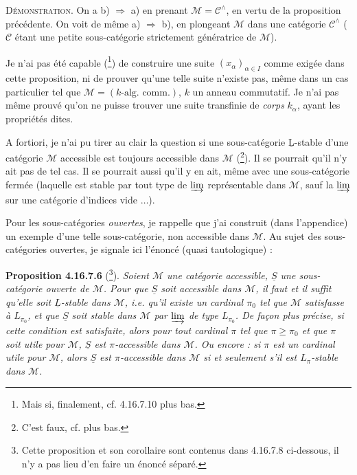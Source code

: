 \documentclass[11pt]{article}
\newcommand{\printedpage}[1]{\marginpar{\footnotesize p.~#1}}
\newcommand{\msp}[1]{\marginpar{\footnotesize [#1]}}
\newcommand{\cM}{\mathcal{M}}
\newcommand{\cC}{\mathcal{C}}
\newcommand{\uS}{\underline{S}}
\begin{document}
\textsc{Démonstration}. On a b) $\Longrightarrow$ a) en prenant $\cM = \cC^\wedge$, en vertu de la proposition précédente. On voit de même a) $\Longrightarrow$ b), en plongeant $\cM$ dans une catégorie $\cC^\wedge$ ($\cC$ étant une petite sous-catégorie strictement génératrice de $\cM$).

Je n'ai pas été capable (\footnote{Mais si, finalement, cf. 4.16.7.10 plus bas.}) de construire une suite $(x_\alpha)_{\alpha\in I}$ comme exigée dans cette proposition, ni de prouver qu'une telle suite n'existe pas, même dans un cas particulier tel que $\cM = (k\text{-alg. comm.})$, $k$ un anneau commutatif. Je n'ai pas
\msp{page 485}
même prouvé qu'on ne puisse trouver une suite transfinie de \textit{corps} $k_\alpha$, ayant les propriétés dites.

A fortiori, je n'ai pu tirer au clair la question si une sous-catégorie $\underline{\mathrm{L}}$-stable d'une catégorie $\cM$ accessible est toujours accessible dans $\cM$ (\footnote{C'est faux, cf. plus bas.}). Il se pourrait qu'il n'y ait pas de tel cas. Il se pourrait aussi qu'il y en ait, même avec une sous-catégorie fermée (laquelle est stable par tout type de $\varinjlim$ représentable dans $\cM$, sauf la $\varinjlim$ sur une catégorie d'indices vide $\ldots$).

\printedpage{188}

Pour les sous-catégories \textit{ouvertes}, je rappelle que j'ai construit (dans l'appendice) un exemple d'une telle sous-catégorie, non accessible dans $\cM$. Au sujet des sous-catégories ouvertes, je signale ici l'énoncé (quasi tautologique) :

\msp{page 486}
\textbf{Proposition 4.16.7.6} (\footnote{Cette proposition et son corollaire sont contenus dans 4.16.7.8 ci-dessous, il n'y a pas lieu d'en faire un énoncé séparé.}). \textit{Soient $\cM$ une catégorie accessible, $\uS$ une sous-catégorie \textup{ouverte} de $\cM$. Pour que $\uS$ soit accessible dans $\cM$, il faut et il suffit qu'elle soit $\underline{L}$-stable dans $\cM$, i.e. qu'il existe un cardinal $\pi_0$ tel que $\cM$ satisfasse à $L_{\pi_0}$, et que $\uS$ soit stable dans $\cM$ par $\varinjlim$ de type $L_{\pi_0}$. De façon plus précise, si cette condition est satisfaite, alors pour tout cardinal $\pi$ tel que $\pi \geqslant \pi_0$ et que $\pi$ soit utile pour $\cM$, $\uS$ est $\pi$-accessible dans $\cM$. Ou encore : si $\pi$ est un cardinal utile pour $\cM$, alors $\uS$ est $\pi$-accessible dans $\cM$ si et seulement s'il est $L_\pi$-stable dans $\cM$.}
\end{document}
